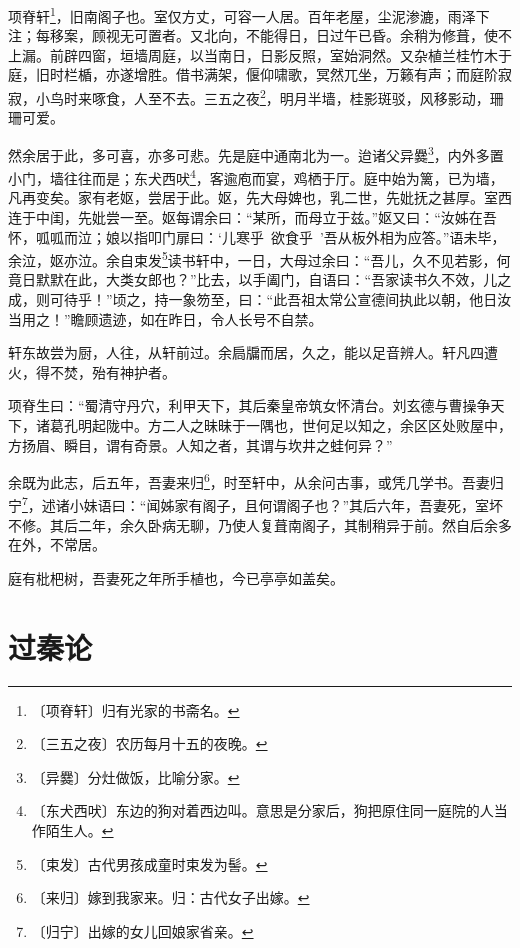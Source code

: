 \documentclass[12pt,UTF-8,openany]{ctexbook}
\begin{document}
\begin{normalsize}
    
    项脊轩\footnote{〔项脊轩〕归有光家的书斋名。}，旧南阁子也。室仅方丈，可容一人居。百年老屋，尘泥渗漉，雨泽下注；每移案，顾视无可置者。又北向，不能得日，日过午已昏。余稍为修葺，使不上漏。前辟四窗，垣墙周庭，以当南日，日影反照，室始洞然。又杂植兰桂竹木于庭，旧时栏楯，亦遂增胜。借书满架，偃仰啸歌，冥然兀坐，万籁有声；而庭阶寂寂，小鸟时来啄食，人至不去。三五之夜\footnote{〔三五之夜〕农历每月十五的夜晚。}，明月半墙，桂影斑驳，风移影动，珊珊可爱。
    
    然余居于此，多可喜，亦多可悲。先是庭中通南北为一。迨诸父异爨\footnote{〔异爨〕分灶做饭，比喻分家。}，内外多置小门，墙往往而是；东犬西吠\footnote{〔东犬西吠〕东边的狗对着西边叫。意思是分家后，狗把原住同一庭院的人当作陌生人。}，客逾庖而宴，鸡栖于厅。庭中始为篱，已为墙，凡再变矣。家有老妪，尝居于此。妪，先大母婢也，乳二世，先妣抚之甚厚。室西连于中闺，先妣尝一至。妪每谓余曰：“某所，而母立于兹。”妪又曰：“汝姊在吾怀，呱呱而泣；娘以指叩门扉曰：‘儿寒乎~欲食乎~’吾从板外相为应答。”语未毕，余泣，妪亦泣。余自束发\footnote{〔束发〕古代男孩成童时束发为髻。}读书轩中，一日，大母过余曰：“吾儿，久不见若影，何竟日默默在此，大类女郎也？”比去，以手阖门，自语曰：“吾家读书久不效，儿之成，则可待乎！”顷之，持一象笏至，曰：“此吾祖太常公宣德间执此以朝，他日汝当用之！”瞻顾遗迹，如在昨日，令人长号不自禁。
    
    轩东故尝为厨，人往，从轩前过。余扃牖而居，久之，能以足音辨人。轩凡四遭火，得不焚，殆有神护者。
    
    项脊生曰：“蜀清守丹穴，利甲天下，其后秦皇帝筑女怀清台。刘玄德与曹操争天下，诸葛孔明起陇中。方二人之昧昧于一隅也，世何足以知之，余区区处败屋中，方扬眉、瞬目，谓有奇景。人知之者，其谓与坎井之蛙何异？”
    
    余既为此志，后五年，吾妻来归\footnote{〔来归〕嫁到我家来。归：古代女子出嫁。}，时至轩中，从余问古事，或凭几学书。吾妻归宁\footnote{〔归宁〕出嫁的女儿回娘家省亲。}，述诸小妹语曰：“闻姊家有阁子，且何谓阁子也？”其后六年，吾妻死，室坏不修。其后二年，余久卧病无聊，乃使人复葺南阁子，其制稍异于前。然自后余多在外，不常居。
    
    庭有枇杷树，吾妻死之年所手植也，今已亭亭如盖矣。
\end{normalsize}



\chapter{过秦论}
\end{document}
